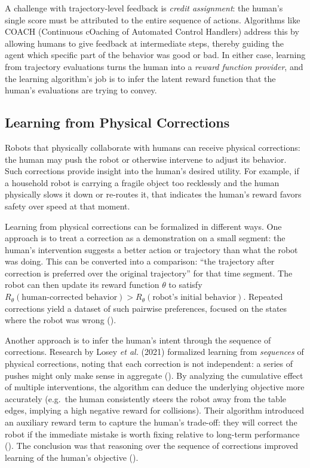 \documentclass[
  letterpaper,
  numbers=noenddot,
  DIV=11]{scrreprt}
\theoremstyle{plain}
\theoremstyle{definition}
\theoremstyle{remark}
\begin{document}
A challenge with trajectory-level feedback is \emph{credit assignment}:
the human's single score must be attributed to the entire sequence of
actions. Algorithms like COACH (Continuous cOaching of Automated Control
Handlers) address this by allowing humans to give feedback at
intermediate steps, thereby guiding the agent which specific part of the
behavior was good or bad. In either case, learning from trajectory
evaluations turns the human into a \emph{reward function provider}, and
the learning algorithm's job is to infer the latent reward function that
the human's evaluations are trying to convey.

\subsection*{Learning from Physical
Corrections}\label{learning-from-physical-corrections}

Robots that physically collaborate with humans can receive physical
corrections: the human may push the robot or otherwise intervene to
adjust its behavior. Such corrections provide insight into the human's
desired utility. For example, if a household robot is carrying a fragile
object too recklessly and the human physically slows it down or
re-routes it, that indicates the human's reward favors safety over speed
at that moment.

Learning from physical corrections can be formalized in different ways.
One approach is to treat a correction as a demonstration on a small
segment: the human's intervention suggests a better action or trajectory
than what the robot was doing. This can be converted into a comparison:
``the trajectory after correction is preferred over the original
trajectory'' for that time segment. The robot can then update its reward
function \(\theta\) to satisfy
\(R_\theta(\text{human-corrected behavior}) > R_\theta(\text{robot’s initial behavior})\).
Repeated corrections yield a dataset of such pairwise preferences,
focused on the states where the robot was wrong
().

Another approach is to infer the human's intent through the sequence of
corrections. Research by Losey \emph{et al.} (2021) formalized learning
from \emph{sequences} of physical corrections, noting that each
correction is not independent: a series of pushes might only make sense
in aggregate
().
By analyzing the cumulative effect of multiple interventions, the
algorithm can deduce the underlying objective more accurately (e.g.~the
human consistently steers the robot away from the table edges, implying
a high negative reward for collisions). Their algorithm introduced an
auxiliary reward term to capture the human's trade-off: they will
correct the robot if the immediate mistake is worth fixing relative to
long-term performance
().
The conclusion was that reasoning over the sequence of corrections
improved learning of the human's objective
().
\end{document}
